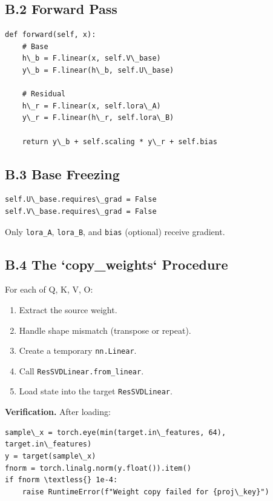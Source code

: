 \subsection{B.2 Forward Pass}

\begin{lstlisting}
def forward(self, x):
    # Base
    h\_b = F.linear(x, self.V\_base)
    y\_b = F.linear(h\_b, self.U\_base)
    
    # Residual
    h\_r = F.linear(x, self.lora\_A)
    y\_r = F.linear(h\_r, self.lora\_B)
    
    return y\_b + self.scaling * y\_r + self.bias
\end{lstlisting}

\subsection{B.3 Base Freezing}

\begin{lstlisting}
self.U\_base.requires\_grad = False
self.V\_base.requires\_grad = False
\end{lstlisting}

Only \texttt{lora\_A}, \texttt{lora\_B}, and \texttt{bias} (optional) receive gradient.

\subsection{B.4 The `copy\_weights` Procedure}

For each of Q, K, V, O:

\begin{enumerate}
\item Extract the source weight.
\item Handle shape mismatch (transpose or repeat).
\item Create a temporary \texttt{nn.Linear}.
\item Call \texttt{ResSVDLinear.from\_linear}.
\item Load state into the target \texttt{ResSVDLinear}.

\end{enumerate}
\textbf{Verification.} After loading:

\begin{lstlisting}
sample\_x = torch.eye(min(target.in\_features, 64), target.in\_features)
y = target(sample\_x)
fnorm = torch.linalg.norm(y.float()).item()
if fnorm \textless{} 1e-4:
    raise RuntimeError(f"Weight copy failed for {proj\_key}")
\end{lstlisting}

